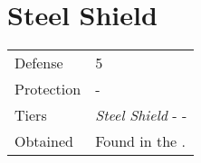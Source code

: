 \section{Steel Shield}
\label{armor:steel_shield}


\noindent\begin{tabularx}{\textwidth}[l]{lX}
	Defense
	& 5
\\
	Protection
	& -
\\
	Tiers
	& \textit{Steel Shield} - \nameref{armor:venus_shield} - \nameref{armor:aegis_shield}
\\
	Obtained
	& Found in the \nameref{map:bone_dungeon}.
\end{tabularx}
